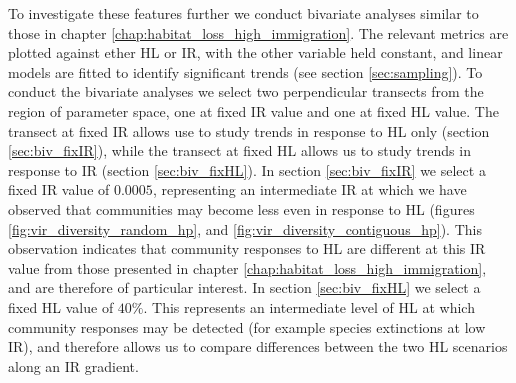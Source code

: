 To investigate these features further we conduct bivariate analyses similar to those in chapter \ref{chap:habitat_loss_high_immigration}. The relevant metrics are plotted against ether HL or IR, with the other variable held constant, and linear models are fitted to identify significant trends (see section \ref{sec:sampling}). To conduct the bivariate analyses we select two perpendicular transects from the region of parameter space, one at fixed IR value and one at fixed HL value. The transect at fixed IR allows use to study trends in response to HL only (section \ref{sec:biv_fixIR}), while the transect at fixed HL allows us to study trends in response to IR (section \ref{sec:biv_fixHL}). In section \ref{sec:biv_fixIR} we select a fixed IR value of $0.0005$, representing an intermediate IR at which we have observed that communities may become less even in response to HL (figures \ref{fig:vir_diversity_random_hp}, and \ref{fig:vir_diversity_contiguous_hp}). This observation indicates that community responses to HL are different at this IR value from those presented in chapter \ref{chap:habitat_loss_high_immigration}, and are therefore of particular interest. In section \ref{sec:biv_fixHL} we select a fixed HL value of $40\%$.  This represents an intermediate level of HL at which community responses may be detected (for example species extinctions at low IR), and therefore allows us to compare differences between the two HL scenarios along an IR gradient.

%


